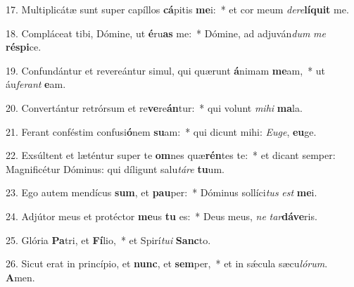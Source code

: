 17. Multiplicátæ sunt super capíllos \textbf{cá}pitis \textbf{me}i:~*  et cor meum \textit{de}\textit{re}\textbf{lí}\textbf{quit} me.\

18. Compláceat tibi, Dómine, ut \textbf{é}ru\textbf{as} me:~*  Dómine, ad adjuván\textit{dum} \textit{me} \textbf{ré}\textbf{spi}ce.\

19. Confundántur et revereántur simul, qui quærunt \textbf{á}nimam \textbf{me}am,~*  ut áu\textit{fe}\textit{rant} \textbf{e}am.\

20. Convertántur retrórsum et re\textbf{ve}re\textbf{án}tur:~*  qui volunt \textit{mi}\textit{hi} \textbf{ma}la.\

21. Ferant conféstim confusi\textbf{ó}nem \textbf{su}am:~*  qui dicunt mihi: \textit{Eu}\textit{ge}, \textbf{eu}ge.\

22. Exsúltent et læténtur super te \textbf{om}nes quæ\textbf{rén}tes te:~*  et dicant semper: Magnificétur Dóminus: qui díligunt salu\textit{tá}\textit{re} \textbf{tu}um.\

23. Ego autem mendícus \textbf{sum}, et \textbf{pau}per:~*  Dóminus sollíci\textit{tus} \textit{est} \textbf{me}i.\

24. Adjútor meus et protéctor \textbf{me}us \textbf{tu} es:~*  Deus meus, \textit{ne} \textit{tar}\textbf{dá}\textbf{ve}ris.\

25. Glória \textbf{Pa}tri, et \textbf{Fí}lio,~*  et Spirí\textit{tu}\textit{i} \textbf{Sanc}to.\

26. Sicut erat in princípio, et \textbf{nunc}, et \textbf{sem}per,~*  et in sǽcula sæcu\textit{ló}\textit{rum}. \textbf{A}men.\

